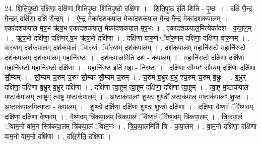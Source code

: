 \documentclass[17pt]{extarticle}
\begin{document}
24. शि॒ति॒पृ॒ष्ठो दक्षि॑णा॒ दक्षि॑णा शितिपृ॒ष्ठः शि॑तिपृ॒ष्ठो दक्षि॑णा । . शि॒ति॒पृ॒ष्ठ इति॑ शिति - पृ॒ष्ठः । . दक्षि॑ णै॒न्द्र मै॒न्द्रम् दक्षि॑णा॒ दक्षि॑ णै॒न्द्रम् । . ऐ॒न्द्र मेका॑दशकपाल॒ मेका॑दशकपाल मै॒न्द्र मै॒न्द्र मेका॑दशकपालम् । . एका॑दशकपाल मृष॒भ ऋ॑ष॒भ एका॑दशकपाल॒ मेका॑दशकपाल मृष॒भः । . एका॑दशकपाल॒मित्येका॑दश - क॒पा॒ल॒म् । . ऋ॒ष॒भो दक्षि॑णा॒ दक्षि॑णर्.ष॒भ ऋ॑ष॒भो दक्षि॑णा । . दक्षि॑णा वारु॒णं ॅवा॑रु॒णम् दक्षि॑णा॒ दक्षि॑णा वारु॒णम् । . वा॒रु॒णम् दश॑कपाल॒म् दश॑कपालं ॅवारु॒णं ॅवा॑रु॒णम् दश॑कपालम् । . दश॑कपालम् म॒हानि॑रष्टो म॒हानि॑रष्टो॒ दश॑कपाल॒म् दश॑कपालम् म॒हानि॑रष्टः । . दश॑कपाल॒मिति॒ दश॑ - क॒पा॒ल॒म् । . म॒हानि॑रष्टो॒ दक्षि॑णा॒ दक्षि॑णा म॒हानि॑रष्टो म॒हानि॑रष्टो॒ दक्षि॑णा । . म॒हानि॑रष्ट॒ इति॑ म॒हा - नि॒र॒ष्टः॒ । . दक्षि॑णा सौ॒म्यꣳ सौ॒म्यम् दक्षि॑णा॒ दक्षि॑णा सौ॒म्यम् । . सौ॒म्यम् च॒रुम् च॒रुꣳ सौ॒म्यꣳ सौ॒म्यम् च॒रुम् । . च॒रुम् ब॒भ्रुर् ब॒भ्रु श्च॒रुम् च॒रुम् ब॒भ्रुः । . ब॒भ्रुर् दक्षि॑णा॒ दक्षि॑णा ब॒भ्रुर् ब॒भ्रुर् दक्षि॑णा । . दक्षि॑णा त्वा॒ष्ट्रम् त्वा॒ष्ट्रम् दक्षि॑णा॒ दक्षि॑णा त्वा॒ष्ट्रम् । . त्वा॒ष्ट्र म॒ष्टाक॑पाल म॒ष्टाक॑पालम् त्वा॒ष्ट्रम् त्वा॒ष्ट्र म॒ष्टाक॑पालम् । . अ॒ष्टाक॑पालꣳ शु॒ण्ठः शु॒ण्ठो᳚ ऽष्टाक॑पाल म॒ष्टाक॑पालꣳ शु॒ण्ठः । . अ॒ष्टाक॑पाल॒मित्य॒ष्टा - क॒पा॒ल॒म् । . शु॒ण्ठो दक्षि॑णा॒ दक्षि॑णा शु॒ण्ठः शु॒ण्ठो दक्षि॑णा । . दक्षि॑णा वैष्ण॒वं ॅवै᳚ष्ण॒वम् दक्षि॑णा॒ दक्षि॑णा वैष्ण॒वम् । . वै॒ष्ण॒वम् त्रि॑कपा॒लम् त्रि॑कपा॒लं ॅवै᳚ष्ण॒वं ॅवै᳚ष्ण॒वम् त्रि॑कपा॒लम् । . त्रि॒क॒पा॒लं ॅवा॑म॒नो वा॑म॒न स्त्रि॑कपा॒लम् त्रि॑कपा॒लं ॅवा॑म॒नः । . त्रि॒क॒पा॒लमिति॑ त्रि - क॒पा॒लम् । . वा॒म॒नो दक्षि॑णा॒ दक्षि॑णा वाम॒नो वा॑म॒नो दक्षि॑णा । . दक्षि॒णेति॒ दक्षि॑णा । \newline
\end{document}
